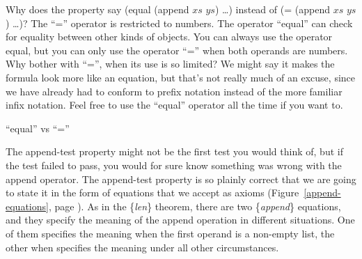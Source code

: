 \begin{aside}
Why does the property say (equal (append $xs$ $ys$) \dots)
instead of (= (append $xs$ $ys$) \dots)?
The ``='' operator
is restricted to numbers. The operator ``equal'' can check
for equality between other kinds of objects.
You can always use the operator equal,
but you can only use the operator ``='' when both operands are numbers.
Why bother with ``='', when its use is so limited?
We might say it makes the formula look more like an equation,
but that's not really much of an excuse,
since we have already had to conform to prefix notation
instead of the more familiar infix notation.
Feel free to use the ``equal'' operator all the time if you want to.
\caption{``equal'' vs ``=''}
\label{equal}
\end{aside}

The append-test property might not be the first test you would think of,
but if the test failed to pass,
you would for sure know something was wrong with the append operator.
The append-test property is so plainly correct that
we are going to state it in the form of equations that we accept as axioms
(Figure~\ref{append-equations}, page \pageref{append-equations}).
As in the \{\emph{len}\} theorem, there are two \{\emph{append}\} equations,
and they specify the meaning of the append operation in different situations.
One of them specifies the meaning when the first operand is a non-empty list,
the other when specifies the meaning under all other circumstances.

